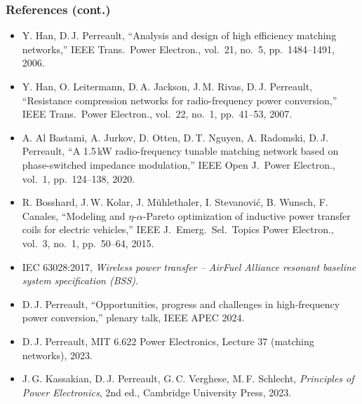 \begin{frame}
	\frametitle{References (cont.)}
	\scriptsize
	\begin{itemize}
		\item Y. Han, D.\,J. Perreault, ``Analysis and design of high efficiency matching networks,'' IEEE Trans.\ Power Electron., vol.\ 21, no.\ 5, pp.\ 1484--1491, 2006.
		\item Y. Han, O. Leitermann, D.\,A. Jackson, J.\,M. Rivas, D.\,J. Perreault, ``Resistance compression networks for radio-frequency power conversion,'' IEEE Trans.\ Power Electron., vol.\ 22, no.\ 1, pp.\ 41--53, 2007.
		\item A. Al Bastami, A. Jurkov, D. Otten, D.\,T. Nguyen, A. Radomski, D.\,J. Perreault, ``A 1.5\,kW radio-frequency tunable matching network based on phase-switched impedance modulation,'' IEEE Open J.\ Power Electron., vol.\ 1, pp.\ 124--138, 2020.
		\item R. Bosshard, J.\,W. Kolar, J. M\"uhlethaler, I. Stevanovi\'c, B. Wunsch, F. Canales, ``Modeling and $\eta$-$\alpha$-Pareto optimization of inductive power transfer coils for electric vehicles,'' IEEE J.\ Emerg.\ Sel.\ Topics Power Electron., vol.\ 3, no.\ 1, pp.\ 50--64, 2015.
		\item IEC 63028:2017, \textit{Wireless power transfer -- AirFuel Alliance resonant baseline system specification (BSS)}.
		\item D.\,J. Perreault, ``Opportunities, progress and challenges in high-frequency power conversion,'' plenary talk, IEEE APEC 2024.
		\item D.\,J. Perreault, MIT 6.622 Power Electronics, Lecture 37 (matching networks), 2023.
		\item J.\,G. Kassakian, D.\,J. Perreault, G.\,C. Verghese, M.\,F. Schlecht, \textit{Principles of Power Electronics}, 2nd ed., Cambridge University Press, 2023.
	\end{itemize}
\end{frame}
